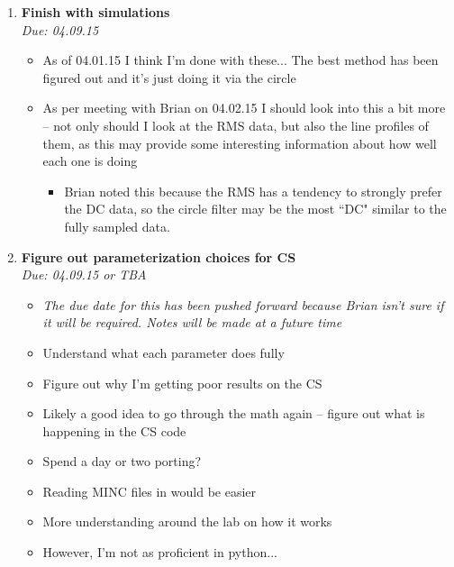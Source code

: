 \documentclass[11 pt]{article}
\newcommand{\bo}{\noindent\textbf}
\begin{document}

      
\begin{enumerate}
	\item \bo{Finish with simulations}\\
	    \emph{Due: 04.09.15}
	    \begin{itemize}
      
		  \item As of 04.01.15 I think I'm done with these... The best method has been figured out and it's just doing it via the circle
		  \item As per meeting with Brian on 04.02.15 I should look into this a bit more -- not only should I look at the RMS data, but also the line profiles of them, as this may provide some interesting information about how well each one is doing
		  \begin{itemize}
			\item Brian noted this because the RMS has a tendency to strongly prefer the DC data, so the circle filter may be the most ``DC" similar to the fully sampled data.
		  \end{itemize}
	    
	    \end{itemize}
      
	\item \bo{Figure out parameterization choices for CS}\\
	    \emph{Due: 04.09.15 or TBA}
	    \begin{itemize}
		  \item \emph{The due date for this has been pushed forward because Brian isn't sure if it will be required. Notes will be made at a future time}
		  \item Understand what each parameter does fully
		  \item Figure out why I'm getting poor results on the CS
		  \item Likely a good idea to go through the math again -- figure out what is happening in the CS code
		  \item Spend a day or two porting?
		  \item Reading MINC files in would be easier
		  \item More understanding around the lab on how it works 
		  \item However, I'm not as proficient in python...
	    \end{itemize}
      

\end{enumerate}
\end{document}
